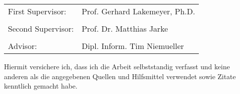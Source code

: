 \newpage
\Large
\begin{tabular}{ l l }
First Supervisor: & Prof. Gerhard Lakemeyer, Ph.D.\\
\\
Second Supervisor: & Prof. Dr. Matthias Jarke\\
\\
Advisor: &  Dipl. Inform. Tim Niemueller\\
\end{tabular}

\vspace{7cm}
Hiermit versichere ich, dass ich die Arbeit selbststandig verfasst und keine anderen als die angegebenen Quellen und Hilfsmittel verwendet sowie Zitate kenntlich gemacht habe.\\

\vspace{3cm}

\large
\makebox[2.5in]{\hrulefill} \hspace {1.0in} \makebox[2.5in]{\hrulefill} \\
 \hspace {1.0in}  \\
\normalsize
